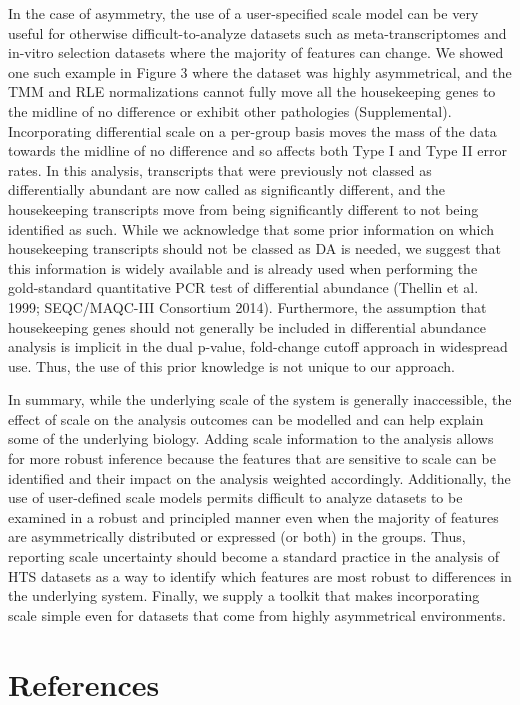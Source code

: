 \documentclass[
]{article}
\begin{document}
In the case of asymmetry, the use of a user-specified scale model can be
very useful for otherwise difficult-to-analyze datasets such as
meta-transcriptomes and in-vitro selection datasets where the majority
of features can change. We showed one such example in Figure 3 where the
dataset was highly asymmetrical, and the TMM and RLE normalizations
cannot fully move all the housekeeping genes to the midline of no
difference or exhibit other pathologies (Supplemental). Incorporating
differential scale on a per-group basis moves the mass of the data
towards the midline of no difference and so affects both Type I and Type
II error rates. In this analysis, transcripts that were previously not
classed as differentially abundant are now called as significantly
different, and the housekeeping transcripts move from being
significantly different to not being identified as such. While we
acknowledge that some prior information on which housekeeping
transcripts should not be classed as DA is needed, we suggest that this
information is widely available and is already used when performing the
gold-standard quantitative PCR test of differential abundance (Thellin
et al. 1999; SEQC/MAQC-III Consortium 2014). Furthermore, the assumption
that housekeeping genes should not generally be included in differential
abundance analysis is implicit in the dual p-value, fold-change cutoff
approach in widespread use. Thus, the use of this prior knowledge is not
unique to our approach.

In summary, while the underlying scale of the system is generally
inaccessible, the effect of scale on the analysis outcomes can be
modelled and can help explain some of the underlying biology. Adding
scale information to the analysis allows for more robust inference
because the features that are sensitive to scale can be identified and
their impact on the analysis weighted accordingly. Additionally, the use
of user-defined scale models permits difficult to analyze datasets to be
examined in a robust and principled manner even when the majority of
features are asymmetrically distributed or expressed (or both) in the
groups. Thus, reporting scale uncertainty should become a standard
practice in the analysis of HTS datasets as a way to identify which
features are most robust to differences in the underlying system.
Finally, we supply a toolkit that makes incorporating scale simple even
for datasets that come from highly asymmetrical environments.

\hypertarget{references}{%
\section*{References}\label{references}}
\end{document}
